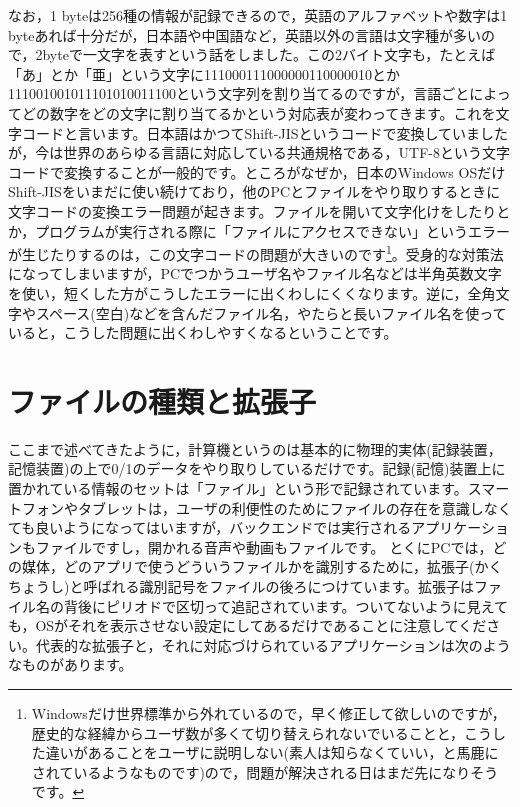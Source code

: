 \documentclass{ltjsbook}
\begin{document}
なお，1 byteは256種の情報が記録できるので，英語のアルファベットや数字は1 byteあれば十分だが，日本語や中国語など，英語以外の言語は文字種が多いので，2byteで一文字を表すという話をしました。この2バイト文字も，たとえば「あ」とか「亜」という文字に111000111000000110000010とか111001001011101010011100という文字列を割り当てるのですが，言語ごとによってどの数字をどの文字に割り当てるかという対応表が変わってきます。これを文字コードと言います。日本語はかつてShift-JISというコードで変換していましたが，今は世界のあらゆる言語に対応している共通規格である，UTF-8という文字コードで変換することが一般的です。ところがなぜか，日本のWindows OSだけShift-JISをいまだに使い続けており，他のPCとファイルをやり取りするときに文字コードの変換エラー問題が起きます。ファイルを開いて文字化けをしたりとか，プログラムが実行される際に「ファイルにアクセスできない」というエラーが生じたりするのは，この文字コードの問題が大きいのです\footnote{Windowsだけ世界標準から外れているので，早く修正して欲しいのですが，歴史的な経緯からユーザ数が多くて切り替えられないでいることと，こうした違いがあることをユーザに説明しない(素人は知らなくていい，と馬鹿にされているようなものです)ので，問題が解決される日はまだ先になりそうです。}。受身的な対策法になってしまいますが，PCでつかうユーザ名やファイル名などは半角英数文字を使い，短くした方がこうしたエラーに出くわしにくくなります。逆に，全角文字やスペース(空白)などを含んだファイル名，やたらと長いファイル名を使っていると，こうした問題に出くわしやすくなるということです。


\section{ファイルの種類と拡張子}
\label{suffix}
ここまで述べてきたように，計算機というのは基本的に物理的実体(記録装置，記憶装置)の上で0/1のデータをやり取りしているだけです。記録(記憶)装置上に置かれている情報のセットは「ファイル」という形で記録されています。スマートフォンやタブレットは，ユーザの利便性のためにファイルの存在を意識しなくても良いようになってはいますが，バックエンドでは実行されるアプリケーションもファイルですし，開かれる音声や動画もファイルです。
とくにPCでは，どの媒体，どのアプリで使うどういうファイルかを識別するために，拡張子(かくちょうし)と呼ばれる識別記号をファイルの後ろにつけています。拡張子はファイル名の背後にピリオドで区切って追記されています。ついてないように見えても，OSがそれを表示させない設定にしてあるだけであることに注意してください。代表的な拡張子と，それに対応づけられているアプリケーションは次のようなものがあります。
\end{document}
